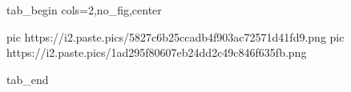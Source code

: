  
 
 
 
 

\ifcmt
  tab_begin cols=2,no_fig,center

     pic https://i2.paste.pics/5827c6b25ccadb4f903ac72571d41fd9.png
		 pic https://i2.paste.pics/1ad295f80607eb24dd2c49c846f635fb.png

  tab_end
\fi

